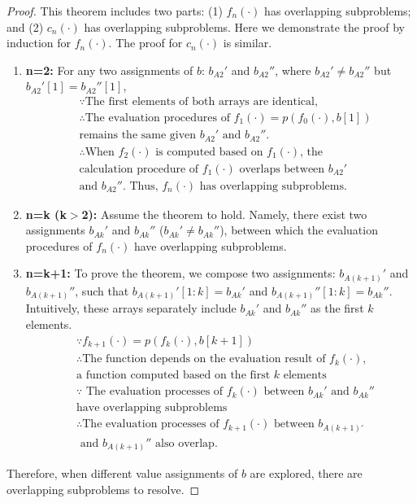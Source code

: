 \begin{proof}
This theorem includes two parts: 
(1) $f_n(\cdot)$ has overlapping subproblems; and (2)  $c_n(\cdot)$ has overlapping subproblems. Here we demonstrate the proof by induction for $f_n(\cdot)$. 
The proof for $c_n(\cdot)$ is similar. 

\begin{enumerate}
    \item \textbf{n=2:} For any two  assignments of $b$: $b_{A2}'$ and $b_{A2}''$, where $b_{A2}'\neq b_{A2}''$ but $b_{A2}'[1]=b_{A2}''[1]$, 
\begin{align}
    & \because \text{The first elements of both arrays are identical,}\nonumber\\
    & \therefore \text{The evaluation procedures of }
    f_1(\cdot)=p(f_0(\cdot), b[1]) \nonumber\\
    &\text{remains the same given $b_{A2}'$ and $b_{A2}''$. } \nonumber\\
    & \therefore \text{When $f_2(\cdot)$ is computed based on $f_1(\cdot)$, the } \nonumber\\
    & \text{calculation procedure of $f_1(\cdot)$ overlaps between $b_{A2}'$ } \nonumber\\
    &\text{and $b_{A2}''$. Thus, $f_n(\cdot)$ has overlapping subproblems.} \nonumber
\end{align}
    \item \textbf{n=k (k$>$2):} Assume the theorem to hold. Namely, there exist two assignments $b_{Ak}'$ and $b_{Ak}''$ ($b_{Ak}'\neq b_{Ak}''$), between which the evaluation procedures of  $f_n(\cdot)$ have overlapping subproblems. 
    \item \textbf{n=k+1:} To prove the theorem, we compose two assignments: $b_{A(k+1)}'$ and $b_{A(k+1)}''$, such that $b_{A(k+1)}'[1:k]=b_{Ak}'$ and $b_{A(k+1)}''[1:k]=b_{Ak}''$. %
    Intuitively, these arrays separately include $b_{Ak}'$ and $b_{Ak}''$ as the first $k$ elements.  
\begin{align}
    & \because f_{k+1}(\cdot)=p(f_{k}(\cdot), b[k+1]) \nonumber \\
   & \therefore \text{The function depends on the evaluation result of $f_{k}(\cdot)$,}\nonumber\\
   & \text{a function computed based on the first $k$ elements} \nonumber \\
   & \because \text{ The evaluation processes of $f_k(\cdot)$ between $b_{Ak}'$ and $b_{Ak}''$} \nonumber \\
   & \text{have overlapping subproblems} \nonumber \\
   & \therefore \text{The evaluation processes of $f_{k+1}(\cdot)$ between $b_{A(k+1)'}$}\nonumber \\
   &\text{ and $b_{A(k+1)}''$ also overlap.} \nonumber 
\end{align}    
\end{enumerate}
Therefore, when different value assignments of $b$ are explored, there are overlapping subproblems to resolve. 
\end{proof}

